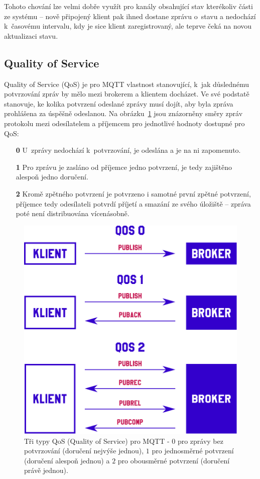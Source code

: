 Tohoto chování lze velmi dobře využít pro kanály obsahující stav kterékoliv části ze systému --
nově připojený klient pak ihned dostane zprávu o~stavu a nedochází k~časovému intervalu, kdy je sice klient
zaregistrovaný, ale teprve čeká na novou aktualizaci stavu.

\subsection{Quality of Service}\label{subsec:quality-of-service}
Quality of Service (QoS) je pro MQTT vlastnost stanovující, k~jak důslednému potvrzování zpráv by mělo mezi
brokerem a klientem docházet.
Ve své podstatě stanovuje, ke kolika potvrzení odeslané zprávy musí dojít, aby byla
zpráva prohlášena za úspěšně odeslanou.
Na obrázku~\ref{fig:mqtt-qos} jsou znázorněny směry zpráv protokolu mezi odesílatelem a příjemcem pro jednotlivé
hodnoty dostupné pro QoS:

\begin{enumerate}
    \item[\textbf{0}] U~zprávy nedochází k~potvrzování, je odeslána a je na ni zapomenuto.
    \item[\textbf{1}] Pro zprávu je zasláno od příjemce jedno potvrzení, je tedy zajištěno alespoň jedno doručení.
    \item[\textbf{2}] Kromě zpětného potvrzení je potvrzeno i samotné první zpětné potvrzení, příjemce tedy
    odesílateli potvrdí příjetí a smazání ze svého úložiště -- zpráva poté není distribuována vícenásobně.
\end{enumerate}

\begin{figure}
    \centering
    \includegraphics[width=.6\textwidth]{figures/qos.pdf}
    \caption{Tři typy QoS (Quality of Service) pro MQTT - $0$ pro zprávy bez potvrzování (doručení nejvýše jednou),
    $1$ pro jednosměrné potvrzení (doručení alespoň jednou) a
    $2$ pro obousměrné potvrzení (doručení právě jednou).}
    \label{fig:mqtt-qos}
\end{figure}

